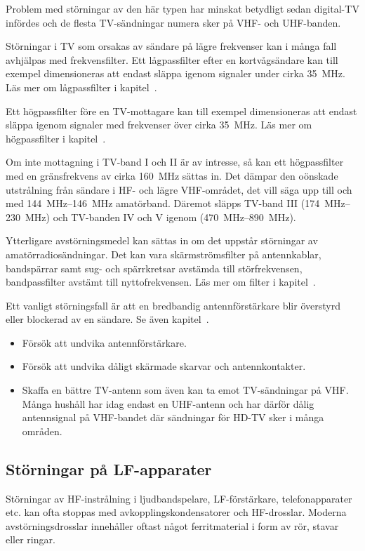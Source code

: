 Problem med störningar av den här typen har minskat betydligt sedan digital-TV
infördes och de flesta TV-sändningar numera sker på VHF- och UHF-banden.

Störningar i TV som orsakas av sändare på lägre frekvenser kan i många fall
avhjälpas med frekvensfilter.
Ett lågpassfilter efter en kortvågsändare kan till exempel dimensioneras att
endast släppa igenom signaler under cirka \qty{35}{\mega\hertz}.
Läs mer om lågpassfilter i kapitel~.

Ett högpassfilter före en TV-mottagare kan till exempel dimensioneras att
endast släppa igenom signaler med frekvenser över cirka \qty{35}{\mega\hertz}.
Läs mer om högpassfilter i kapitel~.

Om inte mottagning i TV-band I och II är av intresse, så kan ett högpassfilter
med en gränsfrekvens av cirka \qty{160}{\mega\hertz} sättas in.
Det dämpar den oönskade utstrålning från sändare i HF- och lägre VHF-området,
det vill säga upp till och med \SIrange{144}{146}{\mega\hertz} amatörband.
Däremot släpps TV-band III (\SIrange{174}{230}{\mega\hertz}) och TV-banden IV
och V igenom (\SIrange{470}{890}{\mega\hertz}).

Ytterligare avstörningsmedel kan sättas in om det uppstår störningar av
amatörradiosändningar.
Det kan vara skärmströmsfilter på antennkablar, bandspärrar samt sug- och
spärrkretsar avstämda till störfrekvensen, bandpassfilter avstämt till
nyttofrekvensen. Läs mer om filter i kapitel~.

Ett vanligt störningsfall är att en bredbandig antennförstärkare blir
överstyrd eller blockerad av en sändare. Se även kapitel~.

\begin{itemize}
\item Försök att undvika antennförstärkare.
\item Försök att undvika dåligt skärmade skarvar och antennkontakter.
\item Skaffa en bättre TV-antenn som även kan ta emot TV-sändningar på VHF.
  Många hushåll har idag endast en UHF-antenn och har därför dålig
  antennsignal på VHF-bandet där sändningar för HD-TV sker i många områden.
\end{itemize}

\subsection{Störningar på LF-apparater}

Störningar av HF-instrålning i ljudbandspelare, LF-förstärkare, telefonapparater
etc. kan ofta stoppas med avkopplingskondensatorer och HF-drosslar.
Moderna avstörningsdrosslar innehåller oftast något ferritmaterial i form av
rör, stavar eller ringar.

